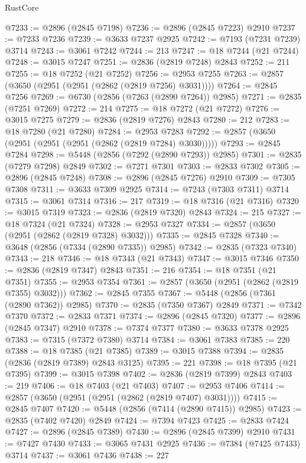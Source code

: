 \begin{lexlean}{RustCore}
\begin{coremodule}
@7233 := @2896 (@2845 @7198)
@7236 := @2896 (@2845 @7223) @2910
@7237 := @7233 @7236
@7239 := @3633 @7237 @2925
@7242 := @7193 (@7231 @7239) @3714
@7243 := @3061 @7242
@7244 := 213
@7247 := @18 @7244 (@21 @7244)
@7248 := @3015 @7247
@7251 := @2836 (@2819 @7248) @2843
@7252 := 211
@7255 := @18 @7252 (@21 @7252)
@7256 := @2953 @7255
@7263 := @2857 (@3650 (@2951 (@2951 (@2862 (@2819 @7256) @3031))))
@7264 := @2845 @7256
@7269 := @6730 (@2856 (@7263 (@2890 @7264)) @2985)
@7271 := @2835 (@7251 @7269)
@7272 := 214
@7275 := @18 @7272 (@21 @7272)
@7276 := @3015 @7275
@7279 := @2836 (@2819 @7276) @2843
@7280 := 212
@7283 := @18 @7280 (@21 @7280)
@7284 := @2953 @7283
@7292 := @2857 (@3650 (@2951 (@2951 (@2951 (@2862 (@2819 @7284) @3030)))))
@7293 := @2845 @7284
@7298 := @5448 (@2856 (@7292 (@2890 @7293)) @2985)
@7301 := @2835 (@7279 @7298) @2849
@7302 := @7271 @7301
@7303 := @2833 @7302
@7305 := @2896 (@2845 @7248)
@7308 := @2896 (@2845 @7276) @2910
@7309 := @7305 @7308
@7311 := @3633 @7309 @2925
@7314 := @7243 (@7303 @7311) @3714
@7315 := @3061 @7314
@7316 := 217
@7319 := @18 @7316 (@21 @7316)
@7320 := @3015 @7319
@7323 := @2836 (@2819 @7320) @2843
@7324 := 215
@7327 := @18 @7324 (@21 @7324)
@7328 := @2953 @7327
@7334 := @2857 (@3650 (@2951 (@2862 (@2819 @7328) @3032)))
@7335 := @2845 @7328
@7340 := @3648 (@2856 (@7334 (@2890 @7335)) @2985)
@7342 := @2835 (@7323 @7340)
@7343 := 218
@7346 := @18 @7343 (@21 @7343)
@7347 := @3015 @7346
@7350 := @2836 (@2819 @7347) @2843
@7351 := 216
@7354 := @18 @7351 (@21 @7351)
@7355 := @2953 @7354
@7361 := @2857 (@3650 (@2951 (@2862 (@2819 @7355) @3032)))
@7362 := @2845 @7355
@7367 := @5448 (@2856 (@7361 (@2890 @7362)) @2985)
@7370 := @2835 (@7350 @7367) @2849
@7371 := @7342 @7370
@7372 := @2833 @7371
@7374 := @2896 (@2845 @7320)
@7377 := @2896 (@2845 @7347) @2910
@7378 := @7374 @7377
@7380 := @3633 @7378 @2925
@7383 := @7315 (@7372 @7380) @3714
@7384 := @3061 @7383
@7385 := 220
@7388 := @18 @7385 (@21 @7385)
@7389 := @3015 @7388
@7394 := @2835 (@2836 (@2819 @7389) @2843 @3125)
@7395 := 221
@7398 := @18 @7395 (@21 @7395)
@7399 := @3015 @7398
@7402 := @2836 (@2819 @7399) @2843
@7403 := 219
@7406 := @18 @7403 (@21 @7403)
@7407 := @2953 @7406
@7414 := @2857 (@3650 (@2951 (@2951 (@2862 (@2819 @7407) @3031))))
@7415 := @2845 @7407
@7420 := @5448 (@2856 (@7414 (@2890 @7415)) @2985)
@7423 := @2835 (@7402 @7420) @2849
@7424 := @7394 @7423
@7425 := @2833 @7424
@7427 := @2896 (@2845 @7389)
@7430 := @2896 (@2845 @7399) @2910
@7431 := @7427 @7430
@7433 := @3065 @7431 @2925
@7436 := @7384 (@7425 @7433) @3714
@7437 := @3061 @7436
@7438 := 227

\end{coremodule}
\end{lexlean}
